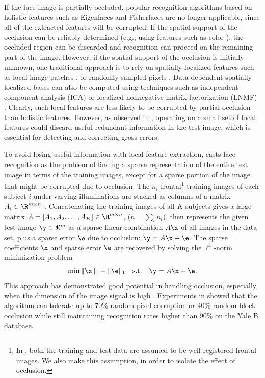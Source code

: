 If the face image is partially occluded, popular recognition algorithms based on holistic features such as Eigenfaces and Fisherfaces \cite{Turk1991-CVPR,Belhumeur1997-PAMI} are no longer applicable, since all of the extracted features will be corrupted. If the spatial support of the occlusion can be reliably determined (e.g., using features such as color \cite{Jia2008-FGR,Jia2009-CVPR}), the occluded region can be discarded and recognition can proceed on the remaining part of the image. However, if the spatial support of the occlusion is initially unknown, one traditional approach is to rely on spatially localized features such as local image patches \cite{Martinez-02,Pentland1994-CVPR,Ahonen2006-PAMI}, or randomly sampled pixels \cite{Leonardis2000-CVIU,Fidler2006-PAMI}. Data-dependent spatially localized bases can also be computed using techniques such as independent component analysis (ICA) or localized nonnegative matrix factorization (LNMF) \cite{KimJ2005-PAMI,LiS2001-CVPR}. Clearly, such local features are less likely to be corrupted by partial occlusion than holistic features. However, as observed in \cite{Wright2009-PAMI}, operating on a small set of local features could discard useful redundant information in the test image, which is essential for detecting and correcting gross errors.

To avoid losing useful information with local feature extraction, \cite{Wright2009-PAMI} casts face recognition as the problem of finding a sparse representation of the entire test image in terms of the training images, except for a sparse portion of the image that might be corrupted due to occlusion.
The $n_i$ frontal\footnote{In \cite{Wright2009-PAMI}, both the training and test data are assumed to be well-registered frontal images. We also make this assumption, in order to isolate the effect of occlusion.} training images of each subject $i$ under
varying illuminations are stacked as columns of a matrix $A_i \in \R^{m\times n_i}$. Concatenating the training images of all $K$ subjects gives a large matrix $A = [A_1,A_2,\ldots,A_K] \in \R^{m\times n}$, ($n = \sum_i n_i$).
\cite{Wright2009-PAMI} then represents the given test image $\y \in \Re^m$ as a sparse linear
combination $A \x$ of all images in the data set, plus a sparse error
$\e$ due to occlusion: $\y = A \x + \e$. The sparse coefficients $\x$ and sparse error $\e$ are recovered by solving the $\ell^1$-norm minimization problem
\begin{equation}
\min \|\x\|_1 + \|\e\|_1\quad \textup{s.t.} \quad \y = A \x + \e.
\end{equation}
This approach has demonstrated good potential in handling occlusion, especially when the dimension of the image signal is high \cite{Wright2008-IT}. Experiments in \cite{Wright2009-PAMI} showed that the algorithm can tolerate up to 70\% random pixel corruption or 40\% random block occlusion while still maintaining recognition rates higher than $90\%$ on the Yale B database.

